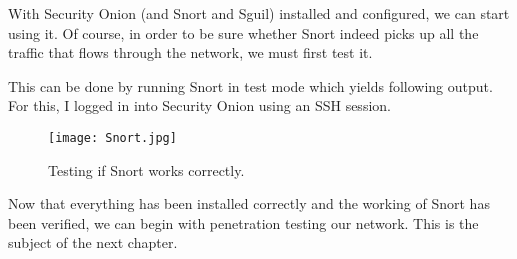 \clearpage
With Security Onion (and Snort and Sguil) installed and configured, we can start using it. Of course, in order to be sure whether Snort indeed picks up all the traffic that flows through the network, we must first test it.

This can be done by running Snort in test mode which yields following output. For this, I logged in into Security Onion using an SSH session.

\begin{figure}[h]
    \centering
    \texttt{[image: Snort.jpg]}
    \caption{Testing if Snort works correctly.}
\end{figure}

Now that everything has been installed correctly and the working of Snort has been verified, we can begin with penetration testing our network. This is the subject of the next chapter.